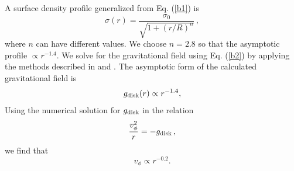 \documentclass[twocolumn,linenumbers]{aastex631}
\begin{document}
A surface density profile generalized from Eq. (\ref{b1}) is
\begin{equation}
\sigma(r) = \frac{\sigma_0}{\sqrt{1 + (r/R)^n}}\, ,
\label{b4}
\end{equation}
where $n$ can have different values. We choose $n=2.8$ so that the asymptotic profile $\propto r^{-1.4}$.
We solve for the gravitational field using Eq. (\ref{b2}) by applying the methods described in \cite{morton1994} and \cite{basu1994}.
The asymptotic form of the calculated gravitational field is
\begin{equation}
    g_{\rm disk}(r) \propto r^{-1.4} ,
    \label{b9}
\end{equation}
Using the numerical solution for $g_{\rm disk}$ in the relation
\begin{align}
\frac{v_{\phi}^2}{r} = - g_{\rm disk}\, ,
\label{b11}
\end{align}
we find that
\begin{equation}
    v_{\phi} \propto r^{-0.2}.
\label{b6}
\end{equation}
\end{document}
